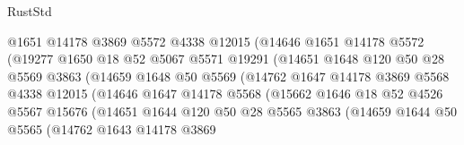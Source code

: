 \begin{lexlean}{RustStd}
\begin{coremodule}
                            @1651
                            @14178
                            @3869
                            @5572
                            @4338
                            @12015
                            (@14646
                              @1651
                              @14178
                              @5572
                              (@19277
                                @1650
                                @18
                                @52
                                @5067
                                @5571
                                @19291
                                (@14651
                                  @1648
                                  @120
                                  @50
                                  @28
                                  @5569
                                  @3863
                                  (@14659
                                    @1648
                                    @50
                                    @5569
                                    (@14762
                                      @1647
                                      @14178
                                      @3869
                                      @5568
                                      @4338
                                      @12015
                                      (@14646
                                        @1647
                                        @14178
                                        @5568
                                        (@15662
                                          @1646
                                          @18
                                          @52
                                          @4526
                                          @5567
                                          @15676
                                          (@14651
                                            @1644
                                            @120
                                            @50
                                            @28
                                            @5565
                                            @3863
                                            (@14659
                                              @1644
                                              @50
                                              @5565
                                              (@14762
                                                @1643
                                                @14178
                                                @3869

\end{coremodule}
\end{lexlean}

